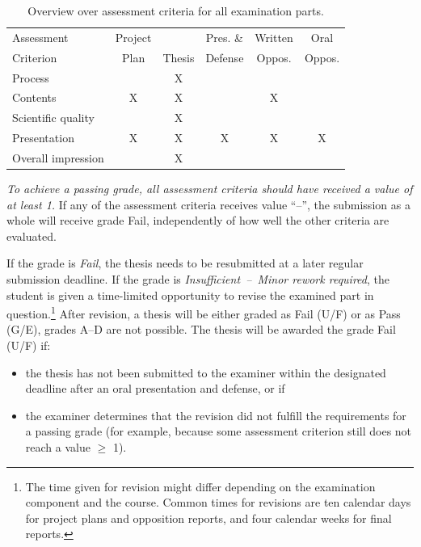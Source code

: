 \documentclass[a4paper,12pt]{book}
\begin{document}
\begin{table}
\centering
\caption{Overview over assessment criteria for all examination parts.}
\label{tab:kriterier-oversikt}
\begin{tabular}{|l|c|c|c|c|c|}
\hline
Assessment          & Project   &           & Pres. \& & Written & Oral    \\
Criterion           & Plan      & Thesis    & Defense  & Oppos.  & Oppos.  \\\hline
Process             &           & X         &          &         &         \\\hline
Contents            & X         & X         &          & X       &         \\\hline
Scientific quality        &           & X         &          &         &         \\\hline
Presentation        & X         & X         & X        & X       & X       \\\hline
Overall impression  &           & X         &          &         &         \\\hline
\end{tabular}
\end{table} 

\emph{To achieve a passing grade,
all assessment criteria should have received a value of at least 1.}
If any of the assessment criteria receives value ``--'', the submission as
a whole will receive grade Fail, independently of how well the
other criteria are evaluated.

If the grade is \emph{Fail}, the thesis
needs to be resubmitted at a later regular submission deadline.
If the grade is \emph{Insufficient~--~Minor rework required}, the student is
given a time-limited opportunity to revise the
examined part in question.\footnote{The time given for revision might differ
depending on the examination component and the course. Common times for revisions are ten calendar days
for project plans and opposition reports, and four calendar weeks for final reports.}
After revision, a thesis will be either graded as Fail (U/F) or as Pass (G/E),
grades A--D are not possible. 
The thesis will be awarded the grade Fail (U/F) if:

\begin{itemize}
\item the thesis has not been submitted to the examiner within the designated
      deadline after an oral presentation and defense, or if
\item the examiner determines that the revision did not fulfill
      the requirements for a passing grade (for example, because some assessment criterion still does not reach a value $\geq$ 1).
\end{itemize}
\end{document}
